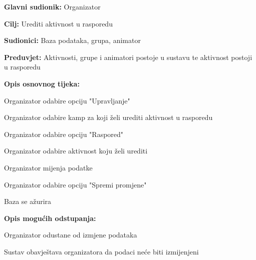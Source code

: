 					\noindent {}
					\begin{packed_item}
						
						\item \textbf{Glavni sudionik: } Organizator
						\item  \textbf{Cilj:} Urediti aktivnost u rasporedu
						\item  \textbf{Sudionici:} Baza podataka, grupa, animator
						\item  \textbf{Preduvjet:} Aktivnosti, grupe i animatori postoje u sustavu te aktivnost postoji u rasporedu
						\item  \textbf{Opis osnovnog tijeka:}
						
						\item[] \begin{packed_enum}
							
							\item Organizator odabire opciju "Upravljanje"
							\item Organizator odabire kamp za koji želi urediti aktivnost u rasporedu
							\item Organizator odabire opciju "Raspored"
							\item Organizator odabire aktivnost koju želi urediti
							\item Organizator mijenja podatke
							\item Organizator odabire opciju "Spremi promjene"
							\item Baza se ažurira

						\end{packed_enum}
						
						\item  \textbf{Opis mogućih odstupanja:}
						
						\item[] \begin{packed_item}
							
							\item[5.a] Organizator odustane od izmjene podataka
							\item[] \begin{packed_enum}
								
								\item Sustav obavještava organizatora da podaci neće biti izmijenjeni
								
							\end{packed_enum}					
						\end{packed_item}
					\end{packed_item}
				
